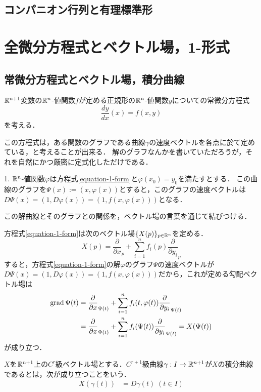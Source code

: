 \documentclass[uplatex,dvipdfmx]{jsreport}
\begin{document}
\section{コンパニオン行列と有理標準形}



\chapter{全微分方程式とベクトル場，1-形式}

\section{常微分方程式とベクトル場，積分曲線}
$\mathbb{R}^{n+1}$変数の$\mathbb{R}^{n}$-値関数$f$が定める正規形の$\mathbb{R}^n$-値関数$y$についての常微分方程式
\begin{equation}\label{equation-1-form}
    \frac{dy}{dx}(x)=f(x,y)
\end{equation}
を考える．

この方程式は，ある関数のグラフである曲線$\gamma$の速度ベクトルを各点に於て定めている，と考えることが出来る．
解のグラフなんかを書いていただろうが，それを自然にかつ厳密に定式化しただけである．
\begin{lemma}
    1. $\mathbb{R}^n$-値関数$\varphi$は方程式\ref{equation-1-form}と$\varphi(x_0)=y_0$を満たすとする．
    この曲線のグラフを$\Psi(x):=(x,\varphi(x))$とすると，このグラフの速度ベクトルは$D\Psi(x)=(1,D\varphi(x))=(1,f(x,\varphi(x)))$となる．
\end{lemma}

この解曲線とそのグラフとの関係を，ベクトル場の言葉を通じて結びつける．
\begin{example}[微分方程式の定めるベクトル場]
    方程式\ref{equation-1-form}は次のベクトル場$\{X(p)\}_{p\in\mathbb{R}^n}$を定める．
    \[ X(p)=\frac{\partial}{\partial x}_p + \sum^n_{i=1}f_i(p)\frac{\partial}{\partial y_i}_p \]
    すると，方程式\ref{equation-1-form}の解$\varphi$のグラフ$\Psi$の速度ベクトルが$D\Psi(x)=(1,D\varphi(x))=(1,f(x,\varphi(x)))$だから，これが定める勾配ベクトル場は
    \begin{align*}
        \operatorname{\mathrm{grad}} \Psi(t) &= \frac{\partial}{\partial x}_{\Psi(t)} + \sum^n_{i=1}f_i(t,\varphi(t))\frac{\partial}{\partial y_i}_{\Psi(t)}\\
        &= \frac{\partial}{\partial x}_{\Psi(t)} + \sum^n_{i=1}f_i(\Psi(t))\frac{\partial}{\partial y_i}_{\Psi(t)} = X(\Psi(t))
    \end{align*}
    が成り立つ．
\end{example}
\begin{definition}
    $X$を$\mathbb{R}^{n+1}$上の$C^r$級ベクトル場とする．$C^{r+1}$級曲線$\gamma:I\to\mathbb{R}^{n+1}$が$X$の積分曲線であるとは，次が成り立つことをいう．
    \begin{align*}
        X(\gamma(t))&=D\gamma(t)\;(t\in I)
    \end{align*}
\end{definition}
\end{document}
